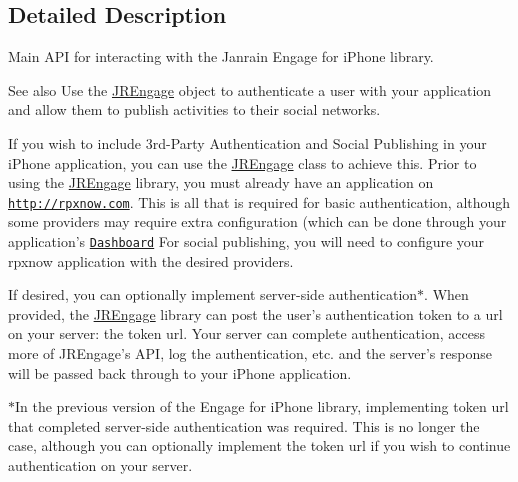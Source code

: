 \subsection{Detailed Description}
Main API for interacting with the Janrain Engage for iPhone library. \begin{DoxySeeAlso}{See also}
Use the \hyperlink{classcom_1_1janrain_1_1android_1_1engage_1_1_j_r_engage}{JREngage} object to authenticate a user with your application and allow them to publish activities to their social networks.
\end{DoxySeeAlso}
If you wish to include 3rd-\/Party Authentication and Social Publishing in your iPhone application, you can use the \hyperlink{classcom_1_1janrain_1_1android_1_1engage_1_1_j_r_engage}{JREngage} class to achieve this. Prior to using the \hyperlink{classcom_1_1janrain_1_1android_1_1engage_1_1_j_r_engage}{JREngage} library, you must already have an application on \href{http://rpxnow.com}{\tt http://rpxnow.com}. This is all that is required for basic authentication, although some providers may require extra configuration (which can be done through your application's \href{http://rpxnow.com/relying_parties}{\tt Dashboard} For social publishing, you will need to configure your rpxnow application with the desired providers.

If desired, you can optionally implement server-\/side authentication$\ast$. When provided, the \hyperlink{classcom_1_1janrain_1_1android_1_1engage_1_1_j_r_engage}{JREngage} library can post the user's authentication token to a url on your server: the token url. Your server can complete authentication, access more of JREngage's API, log the authentication, etc. and the server's response will be passed back through to your iPhone application.

$\ast$In the previous version of the Engage for iPhone library, implementing token url that completed server-\/side authentication was required. This is no longer the case, although you can optionally implement the token url if you wish to continue authentication on your server. 

